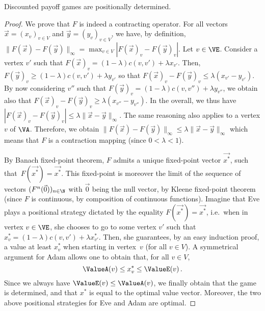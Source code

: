 \begin{theorem}\label{4-thm:discounted}
  Discounted payoff games are positionally determined.
\end{theorem}
\begin{proof}
  We prove that $F$ is indeed a contracting operator.
  For all vectors $\vec x=(x_v)_{v\in V}$ and
  $\vec y = (y_v)_{v\in V}$, we have, by definition,
  $\|F(\vec x)-F(\vec y)\|_\infty = \max_{v\in V}|F(\vec x)_v-F(\vec
  y)_v|$. Let $v\in \VE$. Consider a vertex $v'$ such that
  $F(\vec x)_v = (1-\lambda) c(v,v') + \lambda x_{v'}$. Then,
  $F(\vec y)_v\geq (1-\lambda) c(v,v') + \lambda y_{v'}$ so that
  $F(\vec x)_v-F(\vec y)_v\leq \lambda(x_{v'}-y_{v'})$. By now
  considering $v''$ such that
  $F(\vec y)_v = (1-\lambda) c(v,v'') + \lambda y_{v''}$, we obtain
  also that $F(\vec x)_v-F(\vec y)_v\geq \lambda(x_{v''}-y_{v''})$. In
  the overall, we thus have
  $|F(\vec x)_v-F(\vec y)_v|\leq \lambda\|\vec x-\vec y\|_\infty$. The
  same reasoning also applies to a vertex $v$ of $\VA$. Therefore, we
  obtain
  $\|F(\vec x)-F(\vec y)\|_\infty\leq \lambda\|\vec x-\vec y\|_\infty$
  which means that $F$ is a contraction mapping (since $0<\lambda<1$).

  By Banach fixed-point theorem, $F$ admits a unique fixed-point
  vector $\vec{x^*}$, such that~$F(\vec{x^*})=\vec {x^*}$. This
  fixed-point is moreover the limit of the sequence of vectors
  $(F^n(\vec 0))_{n\in \N}$ with $\vec 0$ being the null vector, by
  Kleene fixed-point theorem (since $F$ is continuous, by composition
  of continuous functions). Imagine that Eve plays a positional
  strategy dictated by the equality $F(\vec{x^*})=\vec {x^*}$,
  i.e.~when in vertex $v\in \VE$, she chooses to go to some vertex
  $v'$ such that $x^*_v = (1-\lambda) c(v,v') + \lambda
  x^*_{v'}$. Then, she guarantees, by an easy induction proof, a value
  at least $x^*_v$ when starting in vertex~$v$ (for all $v\in V$). A
  symmetrical argument for Adam allows one to obtain that, for all
  $v\in V$, \[\ValueA(v)\leq x^*_v \leq \ValueE(v)\,.\] Since we
  always have $\ValueE(v)\leq \ValueA(v)$, we finally obtain that the
  game is determined, and that $x^*$ is equal to the optimal value
  vector. Moreover, the two above positional strategies for Eve and
  Adam are optimal.
\end{proof}

